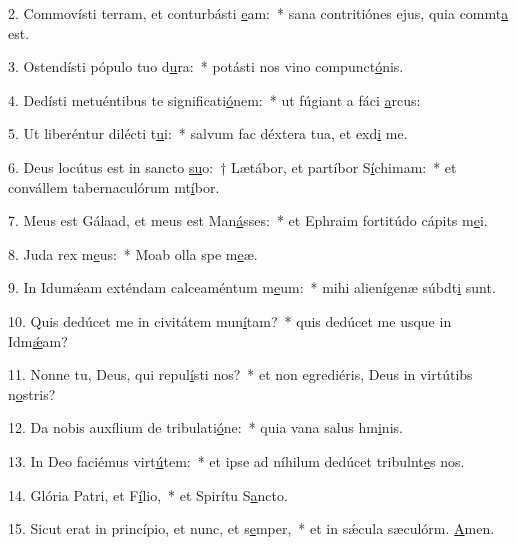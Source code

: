 2. Commovísti terram, et conturbásti \uline{e}am:~* sana contritiónes ejus, quia commt\uline{a} est.\par 
3. Ostendísti pópulo tuo d\uline{u}ra:~* potásti nos vino compunct\uline{ó}nis.\par 
4. Dedísti metuéntibus te significati\uline{ó}nem:~* ut fúgiant a fáci \uline{a}rcus:\par 
5. Ut liberéntur dilécti t\uline{u}i:~* salvum fac déxtera tua, et exd\uline{i} me.\par 
6. Deus locútus est in sancto \uline{su}o:~† Lætábor, et partíbor S\uline{í}chimam:~* et convállem tabernaculórum mt\uline{í}bor.\par 
7. Meus est Gálaad, et meus est Man\uline{á}sses:~* et Ephraim fortitúdo cápits m\uline{e}i.\par 
8. Juda rex m\uline{e}us:~* Moab olla spe m\uline{e}æ.\par 
9. In Idumǽam exténdam calceaméntum m\uline{e}um:~* mihi alienígenæ súbdt\uline{i} sunt.\par 
10. Quis dedúcet me in civitátem mun\uline{í}tam?~* quis dedúcet me usque in Idm\uline{ǽ}am?\par 
11. Nonne tu, Deus, qui repul\uline{í}sti nos?~* et non egrediéris, Deus in virtútibs n\uline{o}stris?\par 
12. Da nobis auxílium de tribulati\uline{ó}ne:~* quia vana salus hm\uline{i}nis.\par 
13. In Deo faciémus virt\uline{ú}tem:~* et ipse ad níhilum dedúcet tribulnt\uline{e}s nos.\par 
14. Glória Patri, et F\uline{í}lio,~* et Spirítu S\uline{a}ncto.\par 
15. Sicut erat in princípio, et nunc, et s\uline{e}mper,~* et in sǽcula sæculórm. \uline{A}men.\par 

